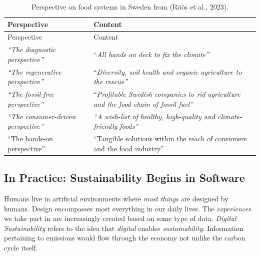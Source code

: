 \documentclass[
  12pt,
  letterpaper,
  DIV=11,
  numbers=noendperiod]{scrartcl}
\begin{document}
\begin{longtable}[]{@{}
  >{\raggedright\arraybackslash}p{}
  >{\raggedright\arraybackslash}p{}@{}}
\caption[Perspectives on the Food Systems in Sweden]{Perspective on food
systems in Sweden from (Röös et al., 2023).}\tabularnewline
\toprule\noalign{}
\begin{minipage}[b]{\linewidth}\raggedright
Perspective
\end{minipage} & \begin{minipage}[b]{\linewidth}\raggedright
Content
\end{minipage} \\
\midrule\noalign{}
\endfirsthead
\toprule\noalign{}
\begin{minipage}[b]{\linewidth}\raggedright
Perspective
\end{minipage} & \begin{minipage}[b]{\linewidth}\raggedright
Content
\end{minipage} \\
\midrule\noalign{}
\endhead
\bottomrule\noalign{}
\endlastfoot
\emph{``The diagnostic perspective''} & ``\emph{All hands on deck to fix
the climate''} \\
\emph{``The regenerative perspective''} & ``\emph{Diversity, soil health
and organic agriculture to the rescue''} \\
\emph{``The fossil-free perspective''} & ``\emph{Profitable Swedish
companies to rid agriculture and the food chain of fossil fuel''} \\
\emph{``The consumer-driven perspective''} & \emph{``A wish-list of
healthy, high-quality and climate-friendly foods''} \\
``The hands-on perspective'' & ``Tangible solutions within the reach of
consumers and the food industry'' \\
\end{longtable}

\let\pandoctableshortcapt\relax

\subsection{In Practice: Sustainability Begins in
Software}\label{in-practice-sustainability-begins-in-software}

Humans live in artificial environments where \emph{most things} are
designed by humans. Design encompasses most everything in our daily
lives. The \emph{experiences} we take part in are increasingly created
based on some type of data. \emph{Digital Sustainability} refers to the
idea that \emph{digital} enables \emph{sustainability}. Information
pertaining to emissions would flow through the economy not unlike the
carbon cycle itself.
\end{document}
